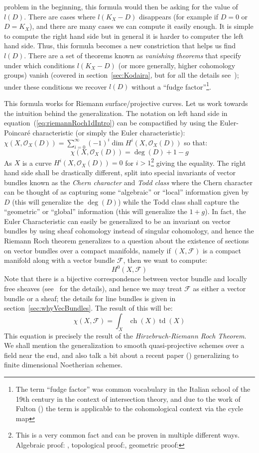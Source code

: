 \documentclass{book}
\newcommand{\CF}{{\mathcal{F}}}
\newcommand{\CO}{{\mathcal{O}}}
\newcommand{\ch}{{\operatorname{ch}}}
\newcommand{\td}{{\operatorname{td}}}
\begin{document}
problem in the beginning, this formula would then be asking for the value of $l(D)$. There are cases where
$l(K_X-D)$ disappears (for example if $D = 0$ or $D = K_X$), and there are many cases we can compute it easily
enough. It is simple to compute the right hand side but in general it is harder to computer the left hand
side. Thus, this formula becomes a new constriction that helps us find $l(D)$. There are a set of theorems
known as \emph{vanishing theorems} that specify under which conditions $l(K_X-D)$ (or more generally, higher
cohomology groups) vanish (covered in section~\ref{sec:Kodaira}, but for all the details
see~\cite{deligneRelevementsModulop2etDecomposition1987}); under these conditions we recover $l(D)$ without
a ``fudge factor''\footnote{The term ``fudge factor'' was common vocabulary in the Italian school of the 19th century in
the context of intersection theory, and due to the work of Fulton (\cite{fultonIntersectionTheory1984}) the
term is applicable to the cohomological context via the cycle map}.


This formula works for Riemann surface/projective curves. Let us work towards the intuition behind the
generalization. The notation on left hand side in equation~(\ref{eq:riemannRoch1dIntro}) can be compactified
by using the Euler-Poincar\'e characteristic (or simply the Euler characteristic): $\chi(X, \CO_X(D)) =
\sum_{i=0}^\infty (-1)^i \dim H^i(X, \CO_X(D))$ so that:
\[
  \chi(X, \CO_X(D)) = \deg(D) + 1-g
\]
As $X$ is a curve $H^i(X, \CO_X(D)) = 0$ for $i > 1$\footnote{This is a very common fact and can be proven  in
  multiple different ways. Algebraic proof: \cite[section~28.3]{NateAlgGeo}, topological
proof:\cite[chapter~3]{NateAlgTop}, geometric proof:\cite[chapter~3]{NateKTheory}}   giving the equality. The
right hand side shall be drastically different, split into special invariants of vector bundles known as the
\emph{Chern character} and \emph{Todd class} where the Chern character can be thought of as capturing some ``algebraic'' or
``local'' information given by $D$ (this will generalize the $\deg(D)$) while the Todd class shall capture the
``geometric'' or ``global'' information (this will generalize the $1+g$). In fact, the Euler Characteristic
can easily be generalized to be an invariant on vector bundles by using sheaf cohomology instead of singular
cohomology, and hence the Riemann Roch theorem generalizes to a question about the existence of sections on
vector bundles over a compact manifolds, namely if $(X,\CF)$ is a compact manifold along with a vector bundle
$\CF$, then we want to compute:
\[
  H^0(X, \CF)
\]
Note that there is a bijective correspondence between vector bundle and locally free sheaves
(see~\cite[chapter~4]{NateAlgGeo} for the details), and hence we may treat $\CF$ as either a vector bundle or
a sheaf; the details for line bundles is given in section~\ref{sec:whyVecBundles}. The result of this will be:
\[
  \chi(X, \CF) = \int_X \ch(X)\td(X)
\]
This equation is precisely the result of the \emph{Hirzebruch-Riemann Roch Theorem}. We shall mention the
generalization to smooth quasi-projective schemes over a field near the end, and also talk a bit about a
recent paper (\cite{navarroRiemannRochFormulaProjective2017}) generalizing to finite dimensional Noetherian
schemes.
\end{document}

